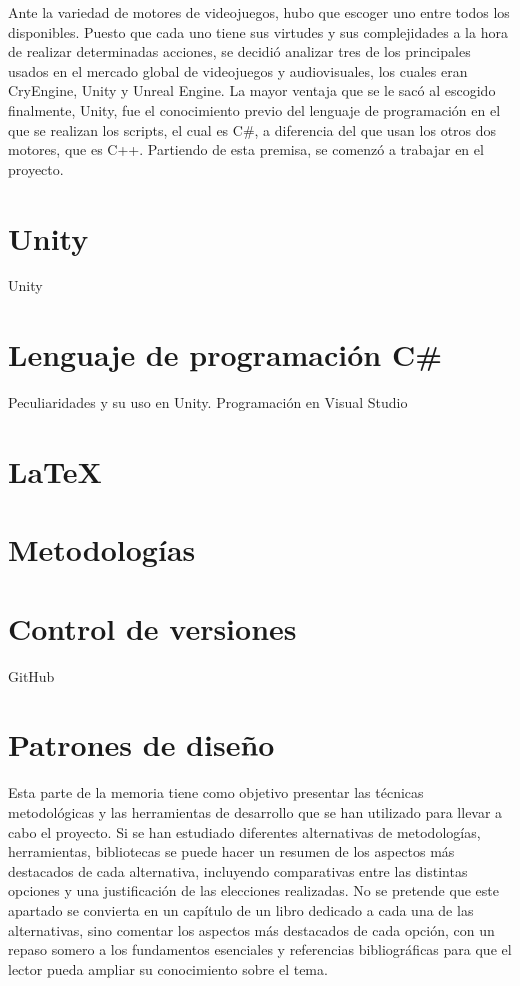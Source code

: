 Ante la variedad de motores de videojuegos, hubo que escoger uno entre todos los disponibles. Puesto que cada uno tiene sus virtudes y sus complejidades a la hora de realizar determinadas acciones, se decidió analizar tres de los principales usados en el mercado global de videojuegos y audiovisuales, los cuales eran CryEngine, Unity y Unreal Engine. La mayor ventaja que se le sacó al escogido finalmente, Unity, fue el conocimiento previo del lenguaje de programación en el que se realizan los scripts, el cual es C\#, a diferencia del que usan los otros dos motores, que es C++. Partiendo de esta premisa, se comenzó a trabajar en el proyecto.

\section{Unity}

Unity 

\section{Lenguaje de programación C\#}

Peculiaridades y su uso en Unity.
Programación en Visual Studio

\section{LaTeX}

\section{Metodologías}

\section{Control de versiones}
GitHub

\section{Patrones de diseño}

Esta parte de la memoria tiene como objetivo presentar las técnicas metodológicas y las herramientas de desarrollo que se han utilizado para llevar a cabo el proyecto. Si se han estudiado diferentes alternativas de metodologías, herramientas, bibliotecas se puede hacer un resumen de los aspectos más destacados de cada alternativa, incluyendo comparativas entre las distintas opciones y una justificación de las elecciones realizadas. 
No se pretende que este apartado se convierta en un capítulo de un libro dedicado a cada una de las alternativas, sino comentar los aspectos más destacados de cada opción, con un repaso somero a los fundamentos esenciales y referencias bibliográficas para que el lector pueda ampliar su conocimiento sobre el tema.